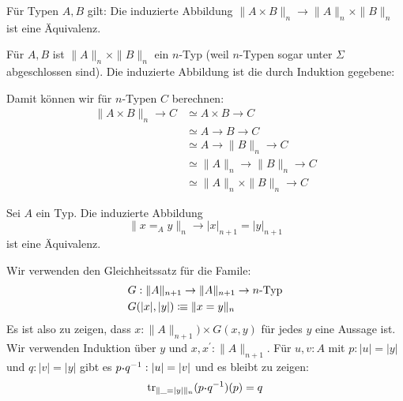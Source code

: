 \begin{lemma}
  Für Typen \(A,B\) gilt: Die induzierte Abbildung \(\|A\times B\|_n\to \|A\|_n\times \|B\|_n\) ist eine Äquivalenz.
\end{lemma}

\begin{beweis}
  Für \(A,B\) ist \(\|A\|_n\times\|B\|_n\) ein \(n\)-Typ (weil \(n\)-Typen sogar unter \(\Sigma\) abgeschlossen sind). Die induzierte Abbildung ist die durch Induktion gegebene:
  \begin{center}
  \end{center}
  Damit können wir für \(n\)-Typen \(C\) berechnen:
  \begin{align*}
    \|A\times B\|_n\to C &\simeq A\times B\to C \\
                         &\simeq A\to B\to C \\
                         &\simeq A\to \|B\|_n\to C \\
                         &\simeq \|A\|_n\to \|B\|_n\to C \\
                         &\simeq \|A\|_n\times \|B\|_n \to C
  \end{align*}
\end{beweis}

\begin{lemma}
  \label{n-abschneidung-gleichheit}
  Sei \(A\) ein Typ. Die induzierte Abbildung
  \[\|x=_Ay\|_n\to |x|_{n+1}=|y|_{n+1}\]
  ist eine Äquivalenz.
\end{lemma}

\begin{beweis}
  Wir verwenden den Gleichheitssatz für die Famile:
  \begin{align*}
    &G:\|A\|_{n+1}\to \|A\|_{n+1}\to n\mbox{-}\mathrm{Typ} \\
    &G(|x|,|y|)\vcentcolon\mspace{-1.2mu}\equiv \|x=y\|_n
  \end{align*}
  Es ist also zu zeigen, dass \(x:\|A\|_{n+1})\times G(x,y)\) für jedes \(y\) eine Aussage ist.
  Wir verwenden Induktion über \(y\) und \(x,x^\prime:\|A\|_{n+1}\). 
  Für \(u,v:A\) mit \(p:|u|=|y|\) und \(q:|v|=|y|\) gibt es \(p\kon q^{-1}:|u|=|v|\) und es bleibt zu zeigen:
  \[\transp_{\|\_=|y|\|_n}(p\kon q^{-1})(p)=q\]
\end{beweis}
